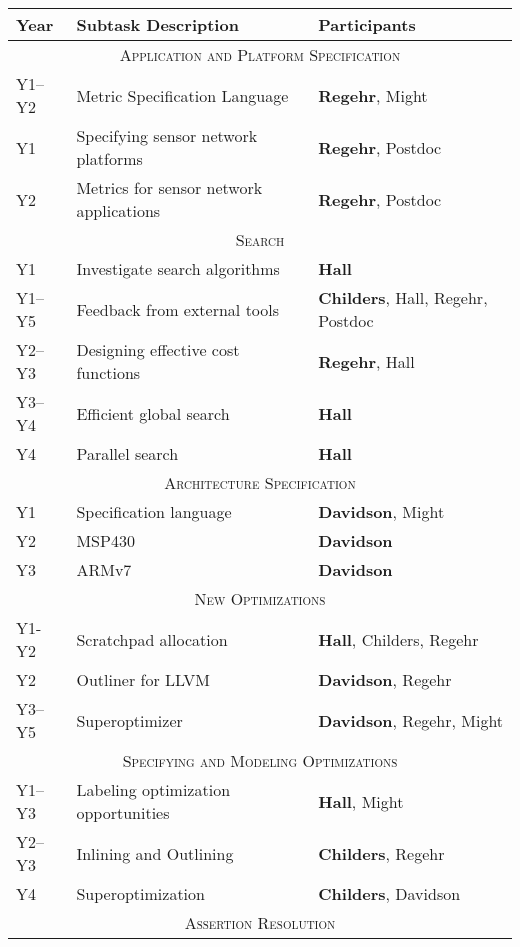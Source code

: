 \vskip 0.2in
\noindent
\begin{center}
\begin{tabular}{l|l|l}
\hline
\textbf{Year} & \textbf{Subtask Description} & \textbf{Participants}\\ \hline
\hline
\multicolumn{3}{c}{\textsc{Application and Platform Specification}}\\ \hline
Y1--Y2 & Metric Specification Language & \textbf{Regehr}, Might \\
Y1 & Specifying sensor network platforms & \textbf{Regehr}, Postdoc\\ 
Y2 & Metrics for sensor network applications & \textbf{Regehr}, Postdoc\\
\hline
\multicolumn{3}{c}{\textsc{Search}}\\ \hline
Y1 & Investigate search algorithms & \textbf{Hall}\\
Y1--Y5 & Feedback from external tools & \textbf{Childers}, Hall, Regehr, Postdoc\\ 
Y2--Y3 & Designing effective cost functions & \textbf{Regehr}, Hall\\
Y3--Y4 & Efficient global search & \textbf{Hall}\\
Y4 & Parallel search & \textbf{Hall}\\
\hline
\multicolumn{3}{c}{\textsc{Architecture Specification}}\\ \hline
Y1 & Specification language & \textbf{Davidson}, Might\\
Y2 & MSP430 & \textbf{Davidson}\\
Y3 & ARMv7 & \textbf{Davidson}\\ 
\hline
\multicolumn{3}{c}{\textsc{New Optimizations}}\\ \hline
Y1-Y2 & Scratchpad allocation & \textbf{Hall}, Childers, Regehr\\
Y2 & Outliner for LLVM & \textbf{Davidson}, Regehr\\
Y3--Y5 & Superoptimizer & \textbf{Davidson}, Regehr, Might\\
\hline
\multicolumn{3}{c}{\textsc{Specifying and Modeling Optimizations}}\\ \hline
Y1--Y3 & Labeling optimization opportunities & \textbf{Hall}, Might\\
Y2--Y3 & Inlining and Outlining & \textbf{Childers}, Regehr\\
Y4 & Superoptimization & \textbf{Childers}, Davidson\\
\hline
\multicolumn{3}{c}{\textsc{Assertion Resolution}}\\ \hline

\end{tabular}
\end{center}
